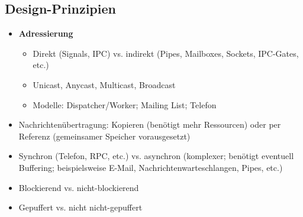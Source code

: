 \subsection{Design-Prinzipien}
\begin{itemize}
	\item \textbf{Adressierung}
	\begin{itemize}
		\item Direkt (Signals, IPC) vs. indirekt (Pipes, Mailboxes, Sockets, IPC-Gates, etc.)
		\item Unicast, Anycast, Multicast, Broadcast
		\item Modelle: Dispatcher/Worker; Mailing List; Telefon
	\end{itemize}
	\item Nachrichtenübertragung: Kopieren (benötigt mehr Ressourcen) oder per Referenz (gemeinsamer Speicher vorausgesetzt)
	\item Synchron (Telefon, RPC, etc.) vs. asynchron (komplexer; benötigt eventuell Buffering; beispielsweise E-Mail, Nachrichtenwarteschlangen, Pipes, etc.)
	\item Blockierend vs. nicht-blockierend
	\item Gepuffert vs. nicht nicht-gepuffert
\end{itemize}


